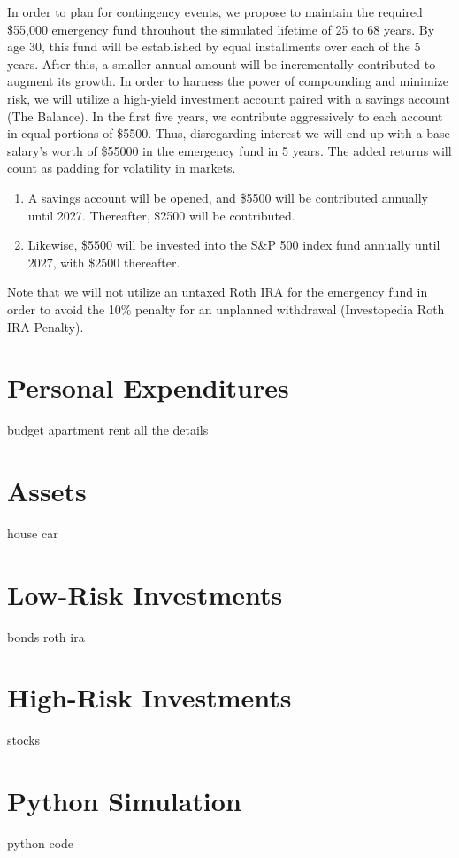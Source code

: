 \documentclass[12pt]{article}
\begin{document}
In order to plan for contingency events, we propose to maintain the required \$55,000 emergency
fund throuhout the simulated lifetime of 25 to 68 years. By age 30, this fund will be established
by equal installments over each of the 5 years. After this, a smaller annual amount will be incrementally contributed to augment its growth.
In order to harness the power of compounding and minimize risk, we will utilize a high-yield investment account
paired with a savings account (The Balance). In the first five years, we contribute aggressively to each account in equal portions of \$5500.
Thus, disregarding interest we will end up with a base salary's worth of \$55000 in the emergency fund in 5 years.
The added returns will count as padding for volatility in markets.

\begin{enumerate}
    \item A savings account will be opened, and \$5500 will be contributed annually until 2027. Thereafter, \$2500 will be contributed.
    \item Likewise, \$5500 will be invested into the S\&P 500 index fund annually until 2027, with \$2500 thereafter.
\end{enumerate}

Note that we will not utilize an untaxed Roth IRA for the emergency fund in order to avoid the 10\% penalty for an unplanned withdrawal (Investopedia Roth IRA Penalty).

\section{Personal Expenditures}

budget
apartment rent
all the details

\section{Assets}

house
car

\section{Low-Risk Investments}

bonds
roth ira

\section{High-Risk Investments}

stocks

\section{Python Simulation}

python code
\end{document}
